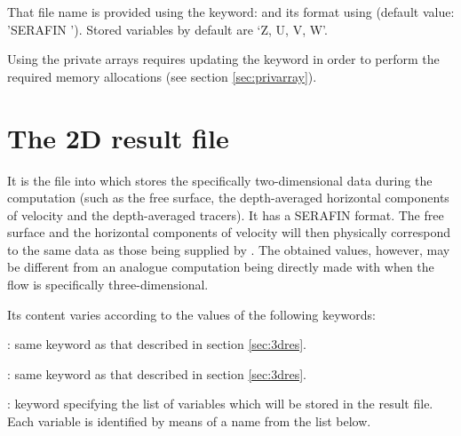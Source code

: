 That file name is provided using the keyword:  and its
format using  (default value: 'SERAFIN '). Stored
variables by default are `Z, U, V, W'.

Using the private arrays requires updating the keyword  in order to perform the required memory allocations (see
section \ref{sec:privarray}).

\section{The 2D result file}

It is the file into which  stores the specifically two-dimensional
data during the computation (such as the free surface, the depth-averaged
horizontal components of velocity and the depth-averaged tracers). It has a
SERAFIN format. The free surface and the horizontal components of velocity will
then physically correspond to the same data as those being supplied by
. The obtained values, however, may be different from an analogue
computation being directly made with  when the flow is specifically
three-dimensional.

Its content varies according to the values of the following keywords:

: same keyword as that
described in section \ref{sec:3dres}.

: same keyword as that described in section
\ref{sec:3dres}.

: keyword specifying the list of
variables which will be stored in the result file. Each variable is identified
by means of a name from the list below.

